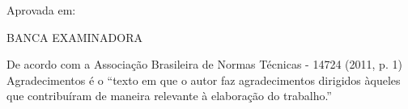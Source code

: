 \documentclass[
        12pt,
        openany, %
        oneside, %
        a4paper,			
        english,			
        brazil			        %
        ]{abntbibufjf}
\begin{document}

\inserecapa

\inserefolhaderosto


\inserecatalog  


\begin{folhadeaprovacao}

  \begin{center}
    {\chapterfont \bfseries \insereautor}

    \vfill
    \begin{center}
      {\chapterfont\bfseries\inseretitulo \inseresubtitulo}
    \end{center}
    \vfill
    
    \hspace{.45\textwidth}
    \begin{minipage}{.5\textwidth}
        \inserenatureza
    \end{minipage}%
    \vfill
   \end{center}
        
   Aprovada em: %
   
   \begin{center} BANCA EXAMINADORA \end{center}
\end{folhadeaprovacao}




\begin{agradecimentos}

De acordo com a Associa\c{c}\~ao Brasileira de Normas T\'ecnicas - 14724 (2011, p. 1) Agradecimentos 
\'e o ``texto em que o autor faz agradecimentos dirigidos \`aqueles que contribu\'iram de maneira relevante \`a elabora\c{c}\~ao do trabalho.''  

\end{agradecimentos}
\end{document}
